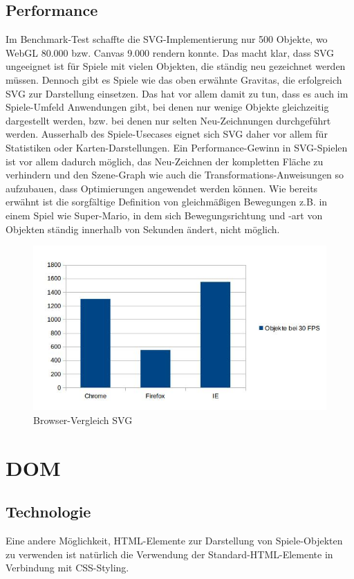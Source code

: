 \documentclass[a4paper, 12pt]{article}
\begin{document}
\subsection{Performance}
Im Benchmark-Test schaffte die SVG-Implementierung nur 500 Objekte, wo WebGL 80.000 bzw. Canvas 9.000 rendern konnte. Das macht klar, dass SVG ungeeignet ist für Spiele mit vielen Objekten, die ständig neu gezeichnet werden müssen. Dennoch gibt es Spiele wie das oben erwähnte Gravitas, die erfolgreich SVG zur Darstellung einsetzen. Das hat vor allem damit zu tun, dass es auch im Spiele-Umfeld Anwendungen gibt, bei denen nur wenige Objekte gleichzeitig dargestellt werden, bzw. bei denen nur selten Neu-Zeichnungen durchgeführt werden. Ausserhalb des Spiele-Usecases eignet sich SVG daher vor allem für Statistiken oder Karten-Darstellungen. Ein Performance-Gewinn in SVG-Spielen ist vor allem dadurch möglich, das Neu-Zeichnen der kompletten Fläche zu verhindern und den Szene-Graph wie auch die Transformations-Anweisungen so aufzubauen, dass Optimierungen angewendet werden können. Wie bereits erwähnt ist die sorgfältige Definition von gleichmäßigen Bewegungen z.B. in einem Spiel wie Super-Mario, in dem sich Bewegungsrichtung und -art von Objekten ständig innerhalb von Sekunden ändert, nicht möglich.
\begin{figure}[H]
	\includegraphics[width=\textwidth]{assets/browser_comp_svg} 
	\caption{Browser-Vergleich SVG}
	\label{browser_comp_svg}
\end{figure}
\newpage
\section{DOM}
\subsection{Technologie}
Eine andere Möglichkeit, HTML-Elemente zur Darstellung von Spiele-Objekten zu verwenden ist natürlich die Verwendung der Standard-HTML-Elemente in Verbindung mit CSS-Styling.
\end{document}
